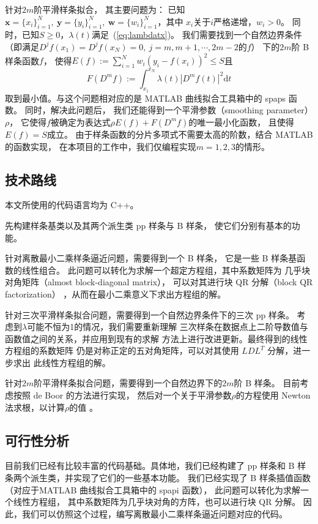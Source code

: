 针对$2m$阶平滑样条拟合，
其主要问题为：
已知$\mathbf{x}=\{x_{i}\}_{i=1}^{N},\ \mathbf{y}=\{y_{i}\}_{i=1}^{N},
\ \mathbf{w}=\{w_{i}\}_{i=1}^{N}$，其中
$x_{i}$关于$i$严格递增，$w_{i}>0$。
同时，已知$S\ge 0$，$\lambda(t)$满足~(\ref{eq:lambdatx})。
我们需要找到一个自然边界条件
（即满足$D^{j}f(x_{1})=D^{j}f(x_{N})=0,\ j=m,m+1,\cdots,2m-2$的$f$）
下的$2m$阶 B 样条函数$f$，
使得$E(f):=\sum_{i=1}^{N}w_{i}(y_{i}-f(x_{i}))^{2}\le S$且
\begin{equation}
  \label{eq:FDmf}
  F(D^{m}f):=\int_{x_{1}}^{x_{N}}\lambda(t)|D^{m}f(t)|^{2}\mathrm{d}t
\end{equation}
取到最小值。与这个问题相对应的是 MATLAB 曲线拟合工具箱中的 spaps 函数。
同时，解决此问题后，
我们还能得到一个平滑参数（smoothing parameter）$\rho$，
它使得$f$被确定为表达式$\rho E(f) + F(D^m f)$的唯一最小化函数，
且使得$E(f)=S$成立。
由于样条函数的分片多项式不需要太高的阶数，结合 MATLAB 的函数实现，
在本项目的工作中，我们仅编程实现$m=1,2,3$的情形。

\subsection{技术路线}
本文所使用的代码语言均为 C++。

先构建样条基类以及其两个派生类 pp 样条与 B 样条，
使它们分别有基本的功能。

针对离散最小二乘样条逼近问题，需要得到一个 B 样条，
它是一些 B 样条基函数的线性组合。
此问题可以转化为求解一个超定方程组，其中系数矩阵为
几乎块对角矩阵（almost block-diagonal matrix），
可以对其进行块 QR 分解（block QR factorization）
\cite{Boor1976SOLVEBLOKAP}，从而在最小二乘意义下求出方程组的解。

针对三次平滑样条拟合问题，需要得到一个自然边界条件下的三次 pp 样条。
考虑到$\lambda$可能不恒为1的情况，我们需要重新理解
三次样条在数据点上二阶导数值与函数值之间的关系，并应用到现有的求解
方法\cite{GuideToSplines}上进行改进更新。最终得到的线性方程组的系数矩阵
仍是对称正定的五对角矩阵，可以对其使用 $LDL^{T}$ 分解，进一步求出
此线性方程组的解。

针对$2m$阶平滑样条拟合问题，需要得到一个自然边界下的$2m$阶 B 样条。
目前考虑按照 de Boor \cite{Boor2001CALCULATIONOT}的方法进行实现，
然后对一个关于平滑参数$\rho$的方程使用 Newton 法求根，以计算$\rho$的值
\cite{SmoothingBySplineFunctions}。

\subsection{可行性分析}
目前我们已经有比较丰富的代码基础。具体地，我们已经构建了
pp 样条和 B 样条两个派生类，并实现了它们的一些基本功能。
我们已经实现了
B 样条插值函数（对应于MATLAB 曲线拟合工具箱中的 spapi 函数），
此问题可以转化为求解一个线性方程组，
其中系数矩阵为几乎块对角的方阵，也可以进行块 QR 分解。
因此，我们可以仿照这个过程，编写离散最小二乘样条逼近问题对应的代码。

